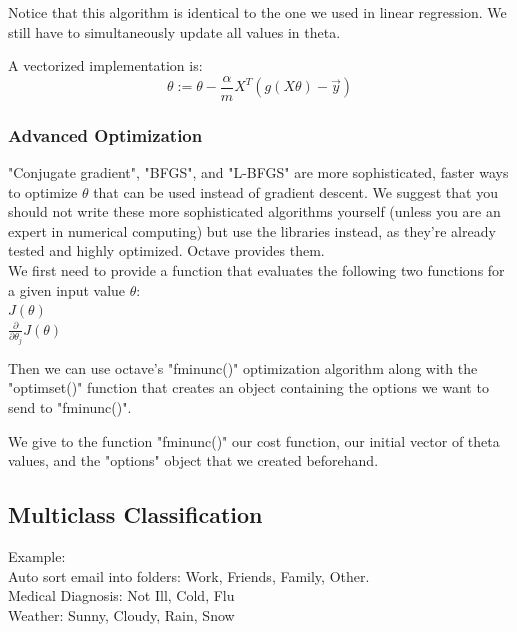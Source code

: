   Notice that this algorithm is identical to the one we used in linear regression. We still have to simultaneously update all values in theta.

  A vectorized implementation is:
  \begin{equation}
    \theta := \theta - \frac{\alpha}{m} X^{T}(g(X\theta) - \overrightarrow{y})
  \end{equation}
  
  \subsubsection{Advanced Optimization}

  "Conjugate gradient", "BFGS", and "L-BFGS" are more sophisticated, faster ways to optimize $\theta$ that can be used instead of gradient descent. We suggest that you should not write these more sophisticated algorithms yourself (unless you are an expert in numerical computing) but use the libraries instead, as they're already tested and highly optimized. Octave provides them.\\
  
  We first need to provide a function that evaluates the following two functions for a given input value $\theta$:\\
  
  $J(\theta)$\\
  $\frac{\partial}{\partial \theta_{j}} J(\theta)$


  Then we can use octave's "fminunc()" optimization algorithm along with the "optimset()" function that creates an object containing the options we want to send to "fminunc()".\\
  

  We give to the function "fminunc()" our cost function, our initial vector of theta values, and the "options" object that we created beforehand.
  
  \subsection{Multiclass Classification}
  Example:\\
  Auto sort email into folders: Work, Friends, Family, Other.\\
  Medical Diagnosis: Not Ill, Cold, Flu\\
  Weather: Sunny, Cloudy, Rain, Snow\\

